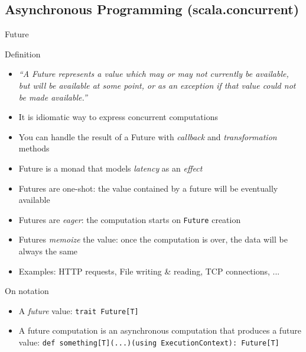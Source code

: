 \documentclass[presentation, 9pt]{beamer}\mode<presentation>{\usetheme{AMSBolognaFC}}
\begin{document}
\subsection{Asynchronous Programming (scala.concurrent)}
\begin{frame}[fragile]{Future}
	\begin{alertblock}{Definition}
		\centering
		\begin{itemize}
			\item \emph{``A Future represents a value which may or may not currently be available, but will be available at some point, or as an exception if that value could not be made available.''}
		\end{itemize}
	\end{alertblock}
\begin{itemize}
 \item It is  idiomatic way to express concurrent computations
 \item You can handle the result of a Future with \emph{callback} and   \emph{transformation} methods
 \item Future is a monad that models \emph{latency} as an \emph{effect}
 \item Futures are one-shot: the value contained by a future will be eventually available
 \item Futures are \emph{eager}: the computation starts on \texttt{Future} creation
 \item Futures \emph{memoize} the value: once the computation is over, the data will be always the same
 \item Examples: HTTP requests, File writing \& reading, TCP connections, ...
\end{itemize}
\begin{alertblock}{On notation}
	\begin{itemize}
		\item A \emph{future} value: \texttt{trait Future[T]}
  	\item A future computation is an asynchronous computation that produces a future value: \texttt{def something[T](...)(using ExecutionContext): Future[T]}
	\end{itemize}
\end{alertblock}
\end{frame}
\end{document}
